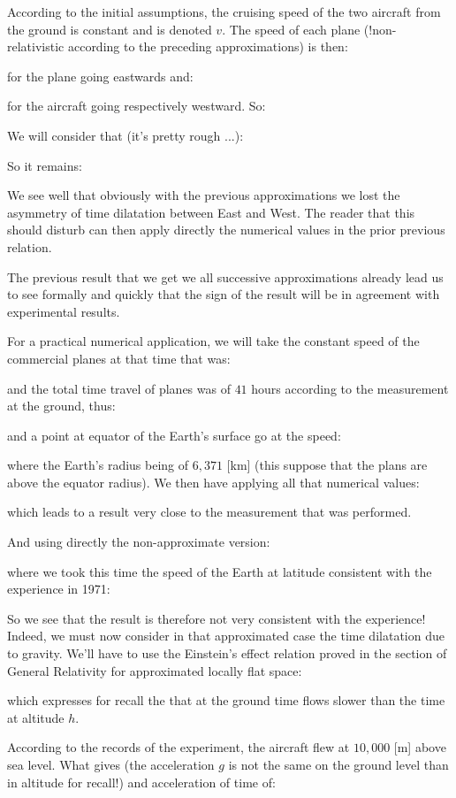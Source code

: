 	According to the initial assumptions, the cruising speed of the two aircraft from the ground is constant and is denoted $v$. The speed of each plane (!non-relativistic according to the preceding approximations) is then:
	
	for the plane going eastwards and:
	
	for the aircraft going respectively westward. So:
	
	We will consider that (it's pretty rough ...):
	
	So it remains:
	
	We see well that obviously with the previous approximations we lost the asymmetry of time dilatation between East and West. The reader that this should disturb can then apply directly the numerical values in the prior previous relation.

	The previous result that we get we all successive approximations already lead us to see formally and quickly that the sign of the result will be in agreement with experimental results.

	For a practical numerical application, we will take the constant speed of the commercial planes at that time that was:
	
	and the total time travel of planes was of $41$ hours according to the measurement at the ground, thus:
	
	and a point at equator of the Earth's surface go at the speed:
	
	where the Earth's radius being of $6,371$ [km] (this suppose that the plans are above the equator radius). We then have applying all that numerical values:
	
	which leads to a result very close to the measurement that was performed.

	And using directly the non-approximate version:
	
	where we took this time the speed of the Earth at latitude consistent with the experience in 1971:
	
	So we see that the result is therefore not very consistent with the experience! Indeed, we must now consider in that approximated case the time dilatation due to gravity. We'll have to use the Einstein's effect relation proved in the section of General Relativity for approximated locally flat space:
	
	which expresses for recall the that at the ground time flows slower than the time at altitude $h$.
	
	According to the records of the experiment, the aircraft flew at $10,000$ [m] above sea level. What gives (the acceleration $g$ is not the same on the ground level than in altitude for recall!) and acceleration of time of:
	
